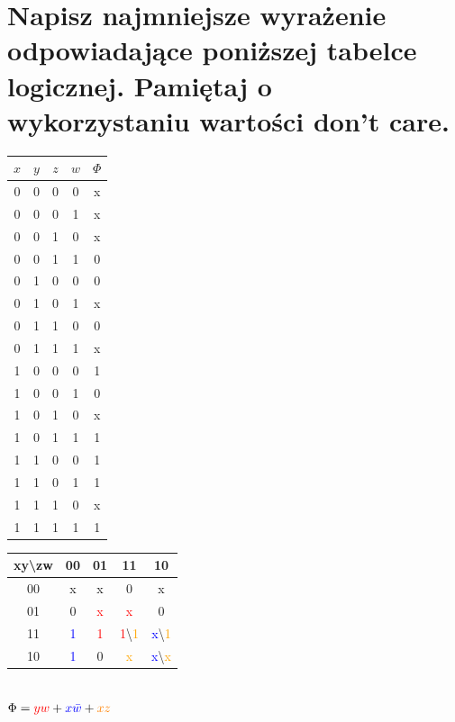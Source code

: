 \documentclass{article}
\begin{document}
\section{Napisz najmniejsze wyrażenie odpowiadające poniższej tabelce logicznej. Pamiętaj o wykorzystaniu wartości don’t care.}
\begin{center}

\begin{tabular}{|c|c|c|c||c|} 
	 \hline
	$x$ & $y$ & $z$ & $w$ & $\Phi$\\ 
	 \hline \hline
	 0&0&0&0&x\\ \hline
	 0&0&0&1&x\\ \hline
	 0&0&1&0&x\\ \hline
	 0&0&1&1&0\\ \hline
	 
	 0&1&0&0&0\\ \hline	 
	 0&1&0&1&x\\ \hline
	 0&1&1&0&0\\ \hline
	 0&1&1&1&x\\ \hline
	 
	 1&0&0&0&1\\ \hline
	 1&0&0&1&0\\ \hline
	 1&0&1&0&x\\ \hline
	 1&0&1&1&1\\ \hline
	 
	 1&1&0&0&1\\ \hline	 
	 1&1&0&1&1\\ \hline
	 1&1&1&0&x\\ \hline
	 1&1&1&1&1\\ \hline
	 \end{tabular}
	 \begin{tabular}{|c|c|c|c|c|} 
	 \hline
	xy\textbackslash zw& 00 & 01 & 11 & 10\\ 
	 \hline
	 00&x&x&0&x \\ \hline
	 01&0&\textcolor{red}{x}&\textcolor{red}{x}&0\\ \hline
	 11&\textcolor{blue}{1}&\textcolor{red}{1}&\textcolor{red}{1}\textbackslash \textcolor{orange}{1}&\textcolor{blue}{x}\textbackslash \textcolor{orange}{1} \\ \hline
	 10&\textcolor{blue}{1}&0&\textcolor{orange}{x}&\textcolor{blue}{x}\textbackslash \textcolor{orange}{x} \\ \hline
	 \end{tabular}\\
	 $\Phi = \textcolor{red}{yw}+\textcolor{blue}{x\bar{w}}+\textcolor{orange}{xz}$
\end{center}
\end{document}

